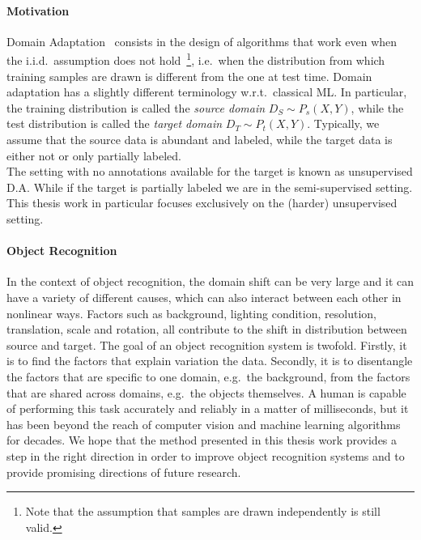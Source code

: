 \documentclass[../main.tex]{subfiles}
\begin{document}
    \paragraph{Motivation}
    Domain Adaptation~\cite{domain-adaptation-review} consists in the design of algorithms that work even when the i.i.d.\
    assumption does not hold~\footnote{Note that the assumption that samples are drawn independently is still valid.},
    i.e.\ when the distribution from which training samples are drawn is different from the one at test time.
    Domain adaptation has a slightly different terminology w.r.t.\ classical ML\@. In particular, the training distribution
    is called the \textit{source domain} $D_{S} \sim P_{s}(X, Y)$, while the test distribution is called the
    \textit{target domain} $D_{T} \sim P_{t}(X, Y)$.
    Typically, we assume that the source data is abundant and labeled, while the target data is either not or only partially labeled. \\
    The setting with no annotations available for the target is known as unsupervised D.A. While if the target is partially labeled we are
    in the semi-supervised setting.
    This thesis work in particular focuses exclusively on the (harder) unsupervised setting.
    
    \paragraph{Object Recognition}
    In the context of object recognition, the domain shift can be very large and it can have a variety
    of different causes, which can also interact between each other in nonlinear ways. Factors such as background, lighting
    condition, resolution, translation, scale and rotation, all contribute to the shift in distribution between source and target.
    The goal of an object recognition system is twofold. Firstly, it is to find the factors that explain variation the data.
    Secondly, it is to disentangle the factors that are specific to one domain, e.g.\ the background, from the factors that are shared across
    domains, e.g.\ the objects themselves.
    A human is capable of performing this task accurately and reliably in a matter of milliseconds, but it has been beyond the
    reach of computer vision and machine learning algorithms for decades. We hope that the method presented in this thesis work
    provides a step in the right direction in order to improve object recognition systems and to provide promising directions
    of future research.
    
\end{document}
